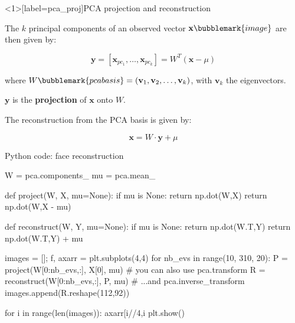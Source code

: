 \documentclass[compress]{beamer}
\begin{document}

\begin{frame}<1>[label=pca_proj]{PCA projection and reconstruction}

    The $k$ principal components of an observed vector
    $\mathbf{x}\bubblemark{image}$ are then given by:

    \[
        \mathbf{y} = [\mathbf{x}_{pc_1},\ldots,\mathbf{x}_{pc_k}] = W^{T} (\mathbf{x} - \mu)
    \]

    \vspace{2em}
    where $W\bubblemark{pcabasis} = (\mathbf{v}_{1}, \mathbf{v}_{2}, \ldots,
    \mathbf{v}_{k})$, with $\mathbf{v}_{k}$ the eigenvectors.

    $\mathbf{y}$ is the \textbf{projection} of $\mathbf{x}$ onto $W$.
    


    \pause
    The reconstruction from the PCA basis is given by:

    \[
        \mathbf{x} = W \cdot \mathbf{y} + \mu
    \]

\end{frame}




\begin{frame}[fragile]{Python code: face reconstruction}

\begin{pythoncode}
W = pca.components_
mu = pca.mean_

def project(W, X, mu=None):
    if mu is None:
        return np.dot(W,X)
    return np.dot(W,X - mu)

def reconstruct(W, Y, mu=None):
    if mu is None:
        return np.dot(W.T,Y)
    return np.dot(W.T,Y) + mu

images = []; f, axarr = plt.subplots(4,4)
for nb_evs in range(10, 310, 20):
    P = project(W[0:nb_evs,:], X[0], mu) # you can also use pca.transform
    R = reconstruct(W[0:nb_evs,:], P, mu) # ...and pca.inverse_transform
    images.append(R.reshape(112,92))

for i in range(len(images)):
    axarr[i//4,i%
plt.show()
\end{pythoncode}
\end{frame}
\end{document}
